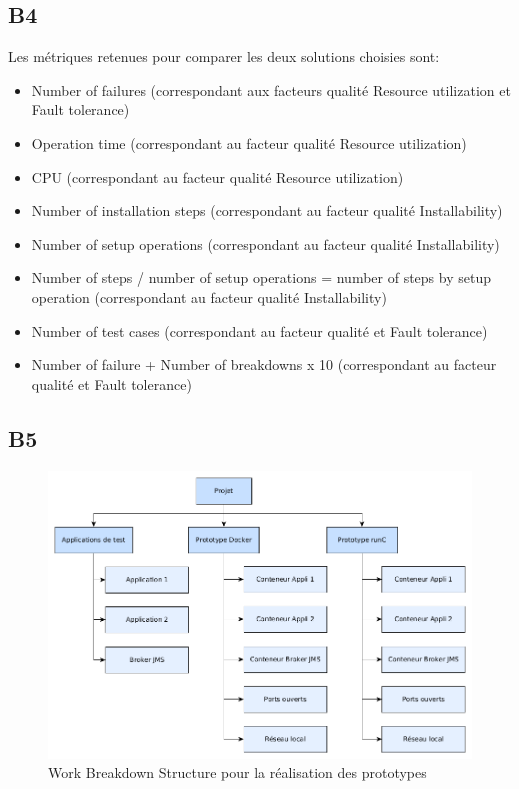 \subsection{B4}
    Les métriques retenues pour comparer les deux solutions choisies sont:
    \begin{itemize}
        \item Number of failures (correspondant aux facteurs qualité Resource utilization et Fault tolerance)
        \item Operation time (correspondant au facteur qualité Resource utilization)
        \item CPU (correspondant au facteur qualité Resource utilization)
        \item Number of installation steps (correspondant au facteur qualité Installability)
        \item Number of setup operations (correspondant au facteur qualité Installability)
        \item Number of steps / number of setup operations = number of steps by setup operation (correspondant au facteur qualité Installability)
        \item Number of test cases (correspondant au facteur qualité et Fault tolerance)
        \item Number of failure + Number of breakdowns x 10 (correspondant au facteur qualité et Fault tolerance)
    \end{itemize}

\subsection{B5}

    \begin{figure}[H]
        \centering
        \includegraphics[width=\textwidth]{images/WBS.png}
        \caption{Work Breakdown Structure pour la réalisation des prototypes}
        \label{fig:wbs}
    \end{figure}

